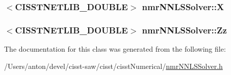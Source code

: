 \subsubsection[{X}]{$<$C\+I\+S\+S\+T\+N\+E\+T\+L\+I\+B\+\_\+\+D\+O\+U\+B\+L\+E$>$ nmr\+N\+N\+L\+S\+Solver\+::\+X\hspace{0.3cm}{\ttfamily [protected]}}\label{classnmr_n_n_l_s_solver_af7ff95aeea4da8d86ac0fd4bc9a220b4}
\hypertarget{classnmr_n_n_l_s_solver_ad4d4544b5db001588a0b9742a0b93abc}{}
\subsubsection[{Zz}]{$<$C\+I\+S\+S\+T\+N\+E\+T\+L\+I\+B\+\_\+\+D\+O\+U\+B\+L\+E$>$ nmr\+N\+N\+L\+S\+Solver\+::\+Zz\hspace{0.3cm}{\ttfamily [protected]}}\label{classnmr_n_n_l_s_solver_ad4d4544b5db001588a0b9742a0b93abc}


The documentation for this class was generated from the following file\+:\begin{DoxyCompactItemize}
\item 
/\+Users/anton/devel/cisst-\/saw/cisst/cisst\+Numerical/\hyperlink{nmr_n_n_l_s_solver_8h}{nmr\+N\+N\+L\+S\+Solver.\+h}\end{DoxyCompactItemize}
